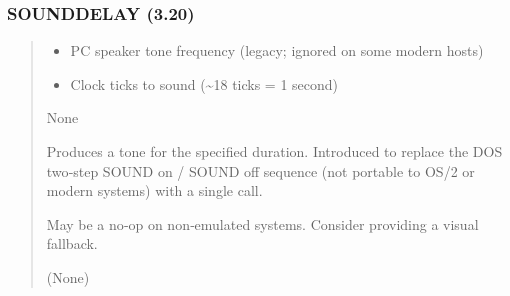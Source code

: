 \documentclass[letterpaper,10pt,english]{sphinxmanual}
\begin{document}
\subsubsection{SOUNDDELAY (3.20)}
\label{\detokenize{ppl:sounddelay-3-20}}\begin{quote}

\sphinxAtStartPar
{}
\begin{description}
\begin{itemize}
\item {} 
\sphinxAtStartPar
{} \textendash{} PC speaker tone frequency (legacy; ignored on some modern hosts)

\item {} 
\sphinxAtStartPar
{}  \textendash{} Clock ticks to sound (\textasciitilde{}18 ticks = 1 second)

\end{itemize}

\sphinxAtStartPar
None

\sphinxAtStartPar
Produces a tone for the specified duration. Introduced to replace the DOS two‑step
SOUND on / SOUND off sequence (not portable to OS/2 or modern systems) with a single call.

\end{description}

\sphinxAtStartPar
{}
\begin{quote}

\begin{sphinxVerbatim}[commandchars=\\\{\}]
     
\end{sphinxVerbatim}
\end{quote}
\begin{description}
\sphinxAtStartPar
May be a no‑op on non‑emulated systems. Consider providing a visual fallback.

\sphinxAtStartPar
(None)

\end{description}
\end{quote}
\end{document}
